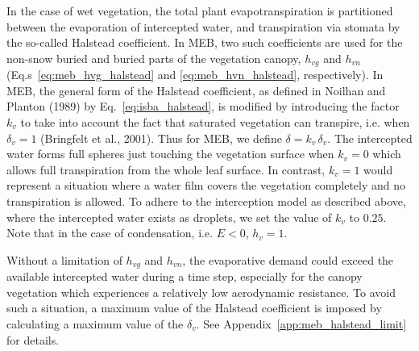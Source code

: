 In the case of wet vegetation, the total plant evapotranspiration 
is  partitioned between the evaporation of intercepted water,
and transpiration via stomata by the so-called Halstead coefficient.
%
In MEB, two such coefficients are used for the 
non-snow buried and buried parts of the vegetation canopy, $h_{vg}$ and $h_{vn}$ 
(Eq.s~\ref{eq:meb_hvg_halstead} and \ref{eq:meb_hvn_halstead}, respectively).
%
%
%
%
%
%
%
%
%
In MEB, the general form of the Halstead coefficient, as defined in 
Noilhan and Planton (1989)\nocite{Noilhan1989} by Eq.~\ref{eq:isba_halstead}, 
is
modified by introducing the
factor $k_v$ to take into account the fact that saturated
vegetation can transpire, i.e. when
$\delta_v=1$ 
(Bringfelt et al., 2001)\nocite{Bringfelt01}. 
Thus for MEB, 
we define $\delta=k_v\,\delta_v$. 
The intercepted water forms full spheres just
touching the vegetation surface 
when $k_v=0$
which allows full transpiration
from the whole leaf
surface. In contrast, $k_v=1$ would represent a situation where a
water film covers
the vegetation completely
and no transpiration is allowed. To adhere to the interception model as
described above, where the
intercepted water exists as droplets, we set the value of $k_v$ to
$0.25$. Note that in the case
of condensation, i.e. $E<0$, $h_v=1$.

Without a limitation of $h_{vg}$ and $h_{vn}$, 
the evaporative demand could exceed
the available intercepted water during
a time step, especially for the canopy vegetation which experiences
a relatively low aerodynamic resistance.
To avoid such a situation, a maximum value of the Halstead
coefficient is imposed by calculating
a maximum value of the $\delta_v$. 
See Appendix~\ref{app:meb_halstead_limit} for details.



